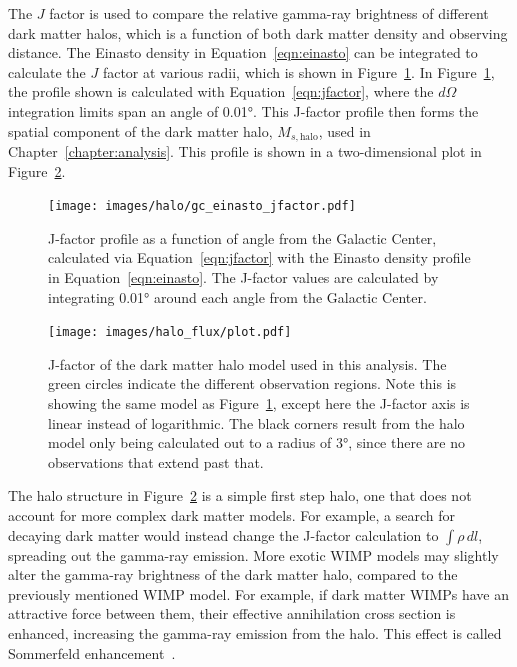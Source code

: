     The $J$ factor is used to compare the relative gamma-ray brightness of different dark matter halos, which is a function of both dark matter density and observing distance.
    The Einasto density in Equation~\ref{eqn:einasto} can be integrated to calculate the $J$ factor at various radii, which is shown in Figure~\ref{fig:gchalo_jfactor}.
    In Figure~\ref{fig:gchalo_jfactor}, the profile shown is calculated with Equation~\ref{eqn:jfactor}, where the $d\Omega$ integration limits span an angle of \ang{0.01}.
    This J-factor profile then forms the spatial component of the dark matter halo, $M_{s,\textrm{halo}}$, used in Chapter~\ref{chapter:analysis}.
    This profile is shown in a two-dimensional plot in Figure~\ref{fig:halojfactor}.
    
    \begin{figure}[!t]
    \centering
      \texttt{[image: images/halo/gc\_einasto\_jfactor.pdf]}
      \caption[Galactic Center Einasto Halo J-Factor]{
        J-factor profile as a function of angle from the Galactic Center, calculated via Equation~\ref{eqn:jfactor} with the Einasto density profile in Equation~\ref{eqn:einasto}.
        The J-factor values are calculated by integrating \ang{0.01} around each angle from the Galactic Center.
      }
      \label{fig:gchalo_jfactor}
    \end{figure}
  
  \begin{figure}[!t]
    \centering
    \texttt{[image: images/halo\_flux/plot.pdf]}
    \caption[Galactic Center Halo J-Factor Sky Map]{
      J-factor of the dark matter halo model used in this analysis.
      The green circles indicate the different observation regions.
      Note this is showing the same model as Figure~\ref{fig:gchalo_jfactor}, except here the J-factor axis is linear instead of logarithmic.
      The black corners result from the halo model only being calculated out to a radius of \ang{3}, since there are no observations that extend past that.
    }
    \label{fig:halojfactor}
  \end{figure}

  The halo structure in Figure~\ref{fig:halojfactor} is a simple first step halo, one that does not account for more complex dark matter models.
  For example, a search for decaying dark matter would instead change the J-factor calculation to $\int \rho \, dl$, spreading out the gamma-ray emission.
  More exotic WIMP models may slightly alter the gamma-ray brightness of the dark matter halo, compared to the previously mentioned WIMP model.
  For example, if dark matter WIMPs have an attractive force between them, their effective annihilation cross section is enhanced, increasing the gamma-ray emission from the halo.
  This effect is called Sommerfeld enhancement~\cite{sommerfeld}.
    
